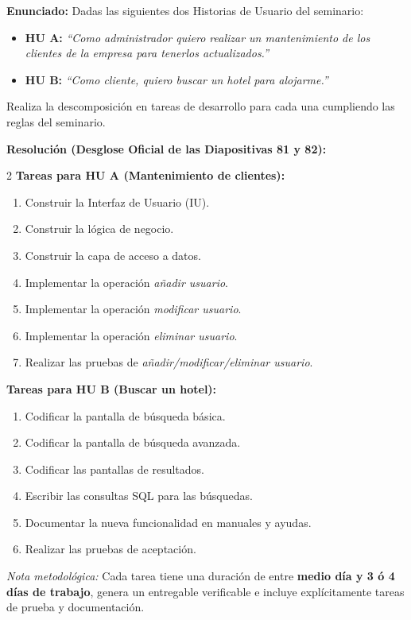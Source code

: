 \begin{ejercicio}
\textbf{Enunciado:} Dadas las siguientes dos Historias de Usuario del seminario:
\begin{itemize}[itemsep=1pt]
    \item \textbf{HU A:} \textit{``Como administrador quiero realizar un mantenimiento de los clientes de la empresa para tenerlos actualizados.''}
    \item \textbf{HU B:} \textit{``Como cliente, quiero buscar un hotel para alojarme.''}
\end{itemize}
Realiza la descomposición en tareas de desarrollo para cada una cumpliendo las reglas del seminario.

\vspace{4pt}
\textbf{Resolución (Desglose Oficial de las Diapositivas 81 y 82):}
\begin{multicols}{2}
\textbf{Tareas para HU A (Mantenimiento de clientes):}
\begin{enumerate}[label=\textbf{\arabic*.}, itemsep=1pt]
    \item Construir la Interfaz de Usuario (IU).
    \item Construir la lógica de negocio.
    \item Construir la capa de acceso a datos.
    \item Implementar la operación \textit{añadir usuario}.
    \item Implementar la operación \textit{modificar usuario}.
    \item Implementar la operación \textit{eliminar usuario}.
    \item Realizar las pruebas de \textit{añadir/modificar/eliminar usuario}.
\end{enumerate}
\columnbreak
\textbf{Tareas para HU B (Buscar un hotel):}
\begin{enumerate}[label=\textbf{\arabic*.}, itemsep=1pt]
    \item Codificar la pantalla de búsqueda básica.
    \item Codificar la pantalla de búsqueda avanzada.
    \item Codificar las pantallas de resultados.
    \item Escribir las consultas SQL para las búsquedas.
    \item Documentar la nueva funcionalidad en manuales y ayudas.
    \item Realizar las pruebas de aceptación.
\end{enumerate}
\end{multicols}
\noindent\textit{Nota metodológica:} Cada tarea tiene una duración de entre \textbf{medio día y 3 ó 4 días de trabajo}, genera un entregable verificable e incluye explícitamente tareas de prueba y documentación.
\end{ejercicio}

